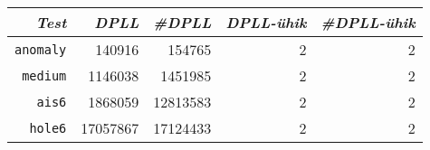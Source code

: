\begin{tabular}{ | r || r | r | r | r | }
\hline
\textit{Test} & \textit{DPLL} & \textit{\#DPLL} & \textit{DPLL-ühik} & \textit{\#DPLL-ühik}\\
\hline
\texttt{anomaly} & 140916 & 154765 & 2 & 2 \\
\hline
\texttt{medium} & 1146038 & 1451985 & 2 & 2 \\
\hline
\texttt{ais6} & 1868059 & 12813583 & 2 & 2 \\
\hline
\texttt{hole6} & 17057867 & 17124433 & 2 & 2 \\
\hline
\end{tabular}
